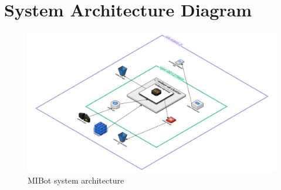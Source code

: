 \chapter{System Architecture Diagram}
\label{app:architecture-diagrams}

\begin{figure}[h!]
	\centering
	\includegraphics[width=0.99\linewidth]{fig/cloudcraft-us-east-2.png}
	\caption{MIBot system architecture}
	\label{fig:mibot-sys-arch}
\end{figure}
